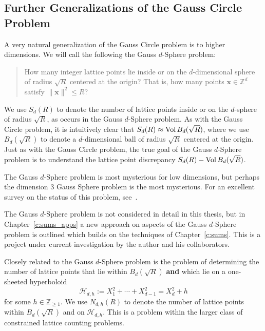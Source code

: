 \subsection{Further Generalizations of the Gauss Circle Problem}



A very natural generalization of the Gauss Circle problem is to higher dimensions.
We will call the following the Gauss $d$-Sphere problem:


\begin{quote}
  How many integer lattice points lie inside or on the $d$-dimensional sphere of radius
  $\sqrt R$ centered at the origin? That is, how many points $\bm x \in \mathbb{Z}^d$
  satisfy $\| \bm x \|^2 \leq R$?
\end{quote}

We use $S_d(R)$ to denote the number of lattice points inside or on the $d$-sphere of
radius $\sqrt R$, as occurs in the Gauss $d$-Sphere problem.
As with the Gauss Circle problem, it is intuitively clear that $S_d(R) \approx \operatorname*{Vol}
B_d(\sqrt R)$, where we use $B_d(\sqrt R)$ to denote a $d$-dimensional ball of radius
$\sqrt R$ centered at the origin.
Just as with the Gauss Circle problem, the true goal of the Gauss $d$-Sphere problem
is to understand the lattice point discrepancy $S_d(R) - \operatorname*{Vol} B_d(\sqrt R)$.


The Gauss $d$-Sphere problem is most mysterious for low dimensions, but perhaps the
dimension $3$ Gauss Sphere problem is the most mysterious.
For an excellent survey on the status of this problem, see~\cite{ivic2004lattice}.


The Gauss $d$-Sphere problem is not considered in detail in this thesis, but in
Chapter~\ref{c:sums_apps} a new approach on aspects of the Gauss $d$-Sphere problem is
outlined which builds on the techniques of Chapter~\ref{c:sums}.
This is a project under current investigation by the author and his collaborators.




Closely related to the Gauss $d$-Sphere problem is the problem of determining the number
of lattice points that lie within $B_d(\sqrt R)$ \textbf{and} which lie on a one-sheeted
hyperboloid
\begin{equation}
  \mathcal{H}_{d,h} := X_1^2 + \cdots + X_{d-1}^2 = X_d^2 + h
\end{equation}
for some $h \in \mathbb{Z}_{\geq 1}$.
We use $N_{d,h}(R)$ to denote the number of lattice points within $B_d(\sqrt R)$ and on
$\mathcal{H}_{d,h}$.
This is a problem within the larger class of constrained lattice counting problems.


